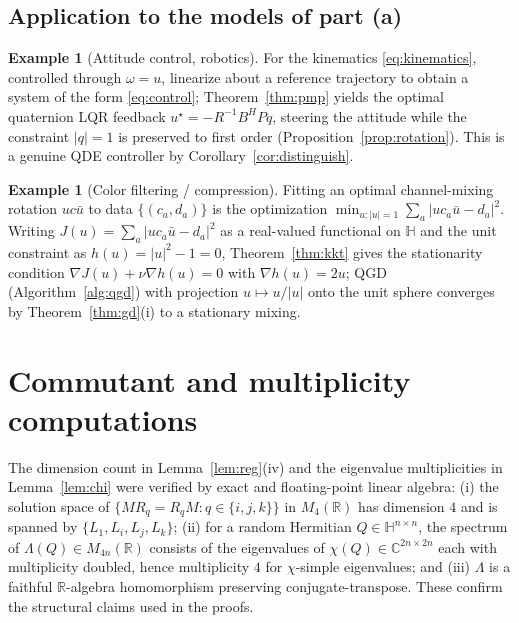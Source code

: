 \documentclass{amsart}
\theoremstyle{definition}
\newtheorem{example}[theorem]{Example}
\newcommand{\HH}{\mathbb{H}}
\newcommand{\RR}{\mathbb{R}}
\newcommand{\CC}{\mathbb{C}}
\begin{document}
\subsection{Application to the models of part (a)}
\begin{example}[Attitude control, robotics]
For the kinematics \eqref{eq:kinematics}, controlled through $\omega=u$, linearize about
a reference trajectory to obtain a system of the form
\eqref{eq:control}; Theorem~\ref{thm:pmp} yields the optimal quaternion
LQR feedback $u^\star=-R^{-1}B^HP q$, steering the attitude while the
constraint $|q|=1$ is preserved to first order
(Proposition~\ref{prop:rotation}). This is a genuine QDE controller by
Corollary~\ref{cor:distinguish}.
\end{example}

\begin{example}[Color filtering / compression]
Fitting an optimal channel-mixing rotation $u c\bar u$ to data
$\{(c_a,d_a)\}$ is the optimization
$\min_{u:|u|=1}\sum_a|u c_a\bar u-d_a|^2$. Writing
$J(u)=\sum_a|uc_a\bar u-d_a|^2$ as a real-valued functional on
$\HH$ and the unit constraint as $h(u)=|u|^2-1=0$,
Theorem~\ref{thm:kkt} gives the stationarity condition
$\nabla J(u)+\nu\nabla h(u)=0$ with $\nabla h(u)=2u$; QGD
(Algorithm~\ref{alg:qgd}) with projection $u\mapsto u/|u|$ onto the unit
sphere converges by Theorem~\ref{thm:gd}(i) to a stationary mixing.
\end{example}

\appendix
\section{Commutant and multiplicity computations}
\label{app:comm}
The dimension count in Lemma~\ref{lem:reg}(iv) and the eigenvalue
multiplicities in Lemma~\ref{lem:chi} were verified by exact and
floating-point linear algebra: (i) the solution space of
$\{MR_q=R_qM:q\in\{i,j,k\}\}$ in $M_4(\RR)$ has dimension $4$ and is
spanned by $\{L_1,L_i,L_j,L_k\}$; (ii) for a random Hermitian
$Q\in\HH^{n\times n}$, the spectrum of $\Lambda(Q)\in M_{4n}(\RR)$
consists of the eigenvalues of $\chi(Q)\in\CC^{2n\times2n}$ each with
multiplicity doubled, hence multiplicity $4$ for $\chi$-simple
eigenvalues; and (iii) $\Lambda$ is a faithful $\RR$-algebra
homomorphism preserving conjugate-transpose. These confirm the
structural claims used in the proofs.
\end{document}
